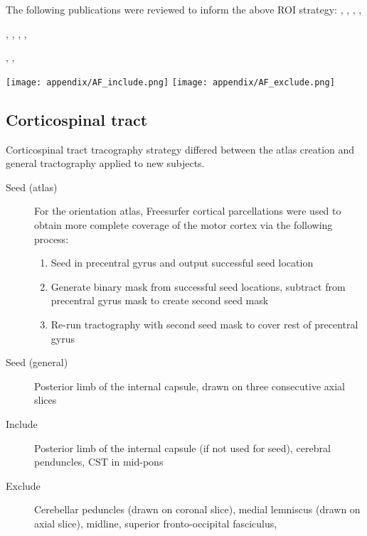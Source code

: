 \documentclass[12pt,phd,a4paper,twoside]{ucl_thesis}
\renewcommand{\textcite}[2][]{
\ifthenelse { \equal {#1} {} }  {\citeauthor{#2}\autocite{#2}}   {\citeauthor{#1}\autocite{#2}}}
\begin{document}
The following publications were reviewed to inform the above ROI strategy: \textcite{Brown2014a},\textcite{Catani2002},\textcite{Catani2005},\textcite{Chen2015c},
\textcite{Eluvathingal2007},\textcite{Kamali2014},\textcite{Martino2013a},\textcite{Nucifora2005},
\textcite{Parker2005},\textcite{Bain2019},\textcite{Talozzi2018}

\begin{figure*}[h]
  \centering
    \texttt{[image: appendix/AF\_include.png]}
    \texttt{[image: appendix/AF\_exclude.png]}
  \caption[Arcuate fasciculus tractography ROIs]{Seed (yellow), inclusion (green) and exclusion (red) \glspl{roi} for the arcuate fasciculus. Arrow indicates central sulcus, landmark for seed ROI.}
  \label{fig:rois.af}
\end{figure*}

\subsection{Corticospinal tract}

Corticospinal tract tracography strategy differed between the atlas creation and general tractography applied to new subjects.

\begin{description}
  \item[Seed (atlas)] For the orientation atlas, Freesurfer cortical parcellations were used to obtain more complete coverage of the motor cortex via the following process:
  \begin{enumerate}
    \item Seed in precentral gyrus and output successful seed location
    \item Generate binary mask from successful seed locations, subtract from precentral gyrus mask to create second seed mask
    \item Re-run tractography with second seed mask to cover rest of precentral gyrus
  \end{enumerate}
  \item[Seed (general)] Posterior limb of the internal capsule, drawn on three consecutive axial slices
  \item[Include] Posterior limb of the internal capsule (if not used for seed), cerebral penduncles, CST in mid-pons
  \item[Exclude] Cerebellar peduncles (drawn on coronal slice), medial lemniscus (drawn on axial slice), midline, superior fronto-occipital fasciculus,
\end{description}
\end{document}
